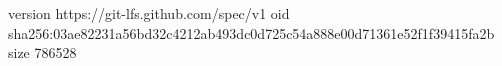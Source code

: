 version https://git-lfs.github.com/spec/v1
oid sha256:03ae82231a56bd32c4212ab493dc0d725c54a888e00d71361e52f1f39415fa2b
size 786528
